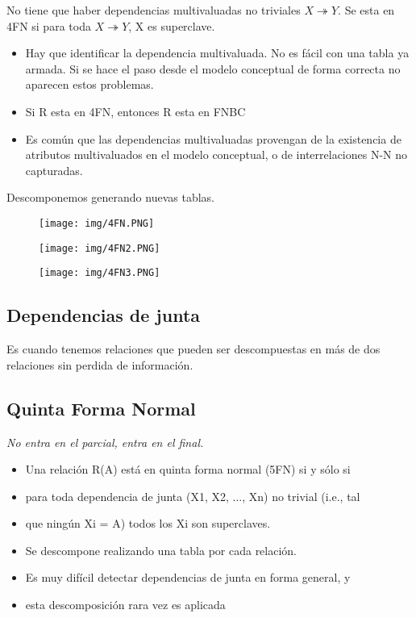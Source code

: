 No tiene que haber dependencias multivaluadas no triviales $X\twoheadrightarrow Y$. Se esta en 4FN si para toda $X\twoheadrightarrow Y$, X es superclave.

\begin{itemize}
\item Hay que identificar la dependencia multivaluada. No es fácil con una tabla ya armada. Si se hace el paso desde el modelo conceptual de forma correcta no aparecen estos problemas.
\item Si R esta en 4FN, entonces R esta en FNBC
\item Es común que las dependencias multivaluadas provengan de la existencia de atributos multivaluados en el modelo conceptual, o de interrelaciones N-N no capturadas.
\end{itemize}

Descomponemos generando nuevas tablas.


\begin{figure}[!htb]
    \centering
    \texttt{[image: img/4FN.PNG]}
\end{figure}

\begin{figure}[!htb]
    \centering
    \texttt{[image: img/4FN2.PNG]}
\end{figure}

\begin{figure}[!htb]
    \centering
    \texttt{[image: img/4FN3.PNG]}
\end{figure}

\subsection*{Dependencias de junta}
Es cuando tenemos relaciones que pueden ser descompuestas en más de dos relaciones sin perdida de información.


\subsection*{Quinta Forma Normal}
\textit{No entra en el parcial, entra en el final.}

\begin{itemize}
\item Una relación R(A) está en quinta forma normal (5FN) si y sólo si
\item para toda dependencia de junta (X1, X2, ..., Xn) no trivial (i.e., tal
\item que ningún Xi = A) todos los Xi son superclaves.
\item Se descompone realizando una tabla por cada relación.
\item Es muy difícil detectar dependencias de junta en forma general, y
\item esta descomposición rara vez es aplicada
\end{itemize}


